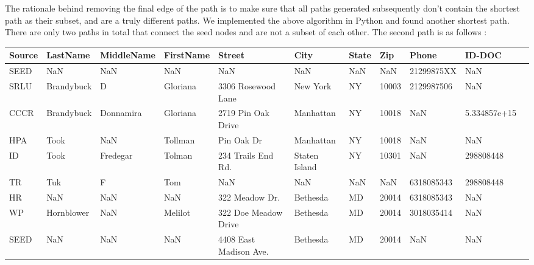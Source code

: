 \documentclass{article} %
\begin{document}
The rationale behind removing the final edge of the path is to make sure that all paths generated subsequently don't contain the shortest path as their subset, and are a truly different paths. We implemented the above algorithm in Python and found another shortest path. There are only two paths in total that connect the seed nodes and are not a subset of each other. The second path is as follows : 

\begin{table}[h]
\centering
\tiny
\begin{tabular}{|l|l|l|l|l|l|l|l|l|l|l|}
\hline
\textbf{Source}  & \textbf{LastName} & \textbf{MiddleName} & \textbf{FirstName} & \textbf{Street} & \textbf{City} & \textbf{State} & \textbf{Zip} & \textbf{Phone} & \textbf{ID-DOC} \\ \hline


SEED&        NaN&        NaN&    NaN&   NaN&  NaN&   NaN&  NaN&   21299875XX&     NaN \\ \hline
   SRLU&  Brandybuck&   D&  Gloriana&  3306 Rosewood Lane&  New York&  NY&  10003&   2129987506&     NaN  \\ \hline
   CCCR&   Brandybuck&  Donnamira&   Gloriana&  2719 Pin Oak Drive&  Manhattan&    NY&  10018&   NaN&  5.334857e+15      \\ \hline
  HPA&    Took&        NaN&   Tollman&  Pin Oak Dr& Manhattan&    NY&  10018&   NaN&     NaN     \\ \hline
    ID&    Took&   Fredegar&   Tolman&  234 Trails End Rd.&  Staten Island&    NY&  10301&   NaN&   298808448 \\ \hline
   TR&       Tuk&          F&     Tom&    NaN&  NaN&   NaN&  NaN&  6318085343&  298808448  \\ \hline
   HR&        NaN&        NaN&    NaN&  322 Meadow Dr.&  Bethesda&    MD&  20014&  6318085343&     NaN  \\ \hline
   WP&  Hornblower&        NaN&    Melilot&  322 Doe Meadow Drive&  Bethesda&    MD&  20014&  3018035414&    NaN  \\ \hline
   SEED&     NaN&        NaN&       NaN&  4408 East Madison Ave.&    Bethesda&    MD&  20014&   NaN&     NaN  \\ \hline
\end{tabular}
\end{table}
\end{document}
